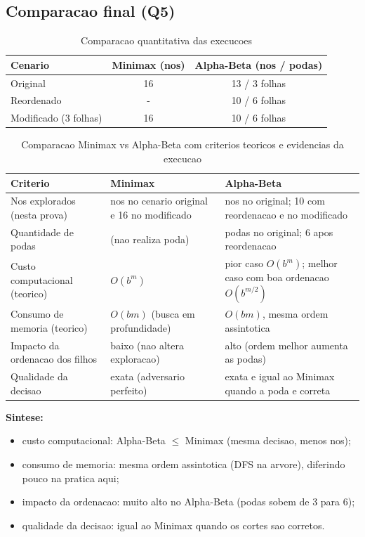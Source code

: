 \subsection{Comparacao final (Q5)}
\begin{table}[H]
\centering
\begin{tabular}{l c c}
\toprule
Cenario & Minimax (nos) & Alpha-Beta (nos / podas) \\
\midrule
Original & 16 & 13 / 3 folhas \\
Reordenado & - & 10 / 6 folhas \\
Modificado (3 folhas) & 16 & 10 / 6 folhas \\
\bottomrule
\end{tabular}
\caption{Comparacao quantitativa das execucoes}
\end{table}

\begin{table}[H]
\centering
\begingroup
\footnotesize
\setlength{\tabcolsep}{4pt}
\renewcommand{\arraystretch}{1.18}
\begin{tabular}{>{\raggedright\arraybackslash}p{3.6cm} >{\raggedright\arraybackslash}p{4.5cm} >{\raggedright\arraybackslash}p{4.5cm}}
\toprule
\textbf{Criterio} & \textbf{Minimax} & \textbf{Alpha-Beta} \\
\midrule
Nos explorados (nesta prova) & 16 nos no cenario original e 16 no modificado & 13 nos no original; 10 com reordenacao e no modificado \\
Quantidade de podas & 0 (nao realiza poda) & 3 podas no original; 6 apos reordenacao \\
Custo computacional (teorico) & $O(b^m)$ & pior caso $O(b^m)$; melhor caso com boa ordenacao $O(b^{m/2})$ \\
Consumo de memoria (teorico) & $O(bm)$ (busca em profundidade) & $O(bm)$, mesma ordem assintotica \\
Impacto da ordenacao dos filhos & baixo (nao altera exploracao) & alto (ordem melhor aumenta as podas) \\
Qualidade da decisao & exata (adversario perfeito) & exata e igual ao Minimax quando a poda e correta \\
\bottomrule
\end{tabular}
\endgroup
\caption{Comparacao Minimax vs Alpha-Beta com criterios teoricos e evidencias da execucao}
\end{table}

\textbf{Sintese:}
\begin{itemize}[leftmargin=1.5em]
  \item custo computacional: Alpha-Beta $\le$ Minimax (mesma decisao, menos nos);
  \item consumo de memoria: mesma ordem assintotica (DFS na arvore), diferindo pouco na pratica aqui;
  \item impacto da ordenacao: muito alto no Alpha-Beta (podas sobem de 3 para 6);
  \item qualidade da decisao: igual ao Minimax quando os cortes sao corretos.
\end{itemize}
